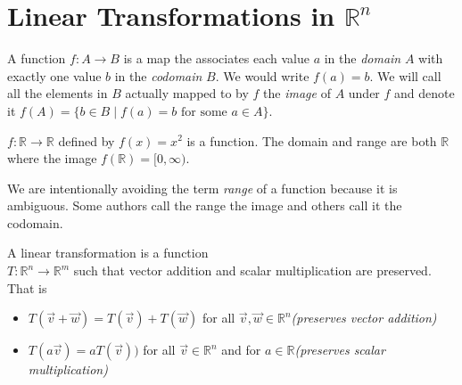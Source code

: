 \section{Linear Transformations in $\mathbb{R}^n$}

\begin{definition}[Function]
A function $f:A \to B$ is a map the associates each value $a$ in the  
\emph{domain} $A$ with exactly one value $b$ in the \emph{codomain} $B$. 
We would write $f(a)=b$. We will call all the elements in $B$ actually mapped 
to by $f$ the \emph{image} of $A$ under $f$ and denote it 
$f(A)=\{ b \in B \mid f(a)=b\text{ for some } a \in A  \}$.
\end{definition}
\begin{example}$f:\mathbb{R} \to \mathbb{R}$ defined by $f(x)=x^2$ is a function. The domain  and range are both $\mathbb{R}$ where the image $f(\mathbb{R})=[0,\infty )$.
\end{example}
\begin{remark}
We are intentionally avoiding the term \emph{range} of a function because it is ambiguous. Some authors call the range the image and others call it the codomain.
\end{remark}
\begin{definition}
A linear transformation is a function\\ $T: \mathbb{R}^n \to \mathbb{R}^m$ such that vector addition and scalar multiplication are preserved.
That is 
\begin{itemize}
\item $T(\vec{v}+\vec{w})=T(\vec{v})+T(\vec{w})$ for all $\vec{v},\vec{w} \in \mathbb{R}^n$\hfill \emph{(preserves vector addition)}
\item $T(a\vec{v})=aT(\vec{v}))$ for all $\vec{v}\in \mathbb{R}^n$ and for $a \in \mathbb{R}$\hfill \emph{(preserves scalar multiplication)}
\end{itemize}
\end{definition}

